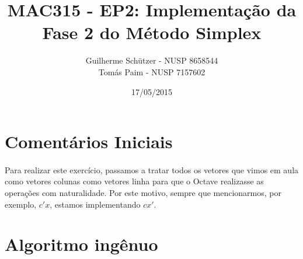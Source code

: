\documentclass[a4paper]{article}
\title{MAC315 - EP2: Implementação da Fase 2 do Método Simplex}
\author{
	Guilherme Schützer - NUSP 8658544 \\
	Tomás Paim         - NUSP 7157602
}
\date{17/05/2015}
\begin{document}
\maketitle

\section{Comentários Iniciais}

\paragraph{}
Para realizar este exercício, passamos a tratar todos os vetores que vimos em aula como vetores colunas como vetores linha para que o Octave realizasse as operações com naturalidade. Por este motivo, sempre que mencionarmos, por exemplo, $c'x$, estamos implementando $cx'$.

\section{Algoritmo ingênuo}
\end{document}

